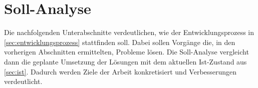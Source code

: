 \section{Soll-Analyse}\label{sec:soll}
Die nachfolgenden Unterabschnitte verdeutlichen, wie der Entwicklungsprozess in \autoref{sec:entwicklungsprozess} stattfinden soll. Dabei sollen Vorgänge die, in den vorherigen Abschnitten ermittelten, Probleme lösen. Die Soll-Analyse vergleicht dann die geplante Umsetzung der Lösungen mit dem aktuellen Ist-Zustand aus \autoref{sec:ist}. Dadurch werden Ziele der Arbeit konkretisiert und Verbesserungen verdeutlicht.
